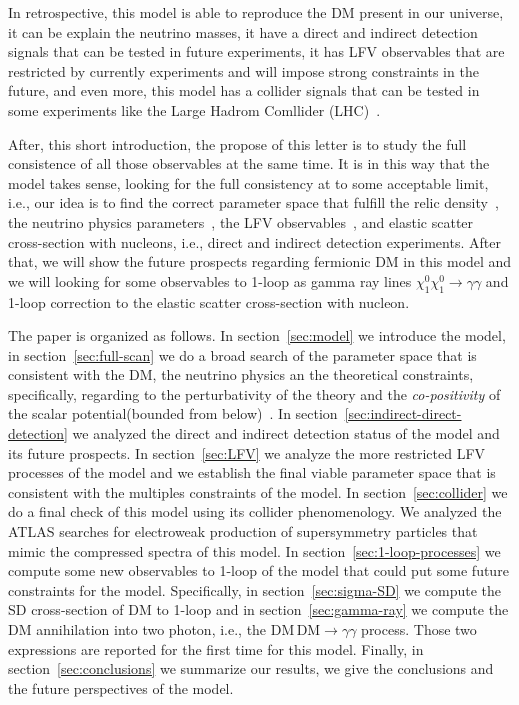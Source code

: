 \documentclass[12pt,letterpaper]{article}
\begin{document}
%
In retrospective, this model is able to reproduce the DM present in our universe, it can be explain the neutrino masses, it have a direct and indirect detection signals that can be tested in future experiments, it has LFV observables that are restricted by currently experiments and will impose strong constraints in the future, and even more, this model has a collider signals that can be tested in some experiments like the Large Hadrom Comllider (LHC)~\cite{Choubey:2017yyn}. 

After, this short introduction, the propose of this letter is to study the full consistence of all those observables at the same time. It is in this way that the model takes sense, looking for the full consistency at to some acceptable limit, i.e., 
our idea is to find the correct parameter space that fulfill the relic density~\cite{Aghanim:2018eyx}, the neutrino physics parameters~\cite{Forero:2014bxa, deSalas:2017kay}, the LFV observables~\cite{Rocha-Moran:2016enp}, and elastic scatter cross-section with nucleons, i.e., direct and indirect detection experiments. 
After that, we will show the future prospects regarding fermionic DM in this model and we will looking for some observables to 1-loop as gamma ray lines $\chi^0_1\chi^0_1\to\gamma\gamma$ and 1-loop correction to the elastic scatter cross-section with nucleon.

The paper is organized as follows. In section~\ref{sec:model} we introduce the model, in section~\ref{sec:full-scan} we do a broad search of the parameter space that is consistent with the DM, the neutrino physics an the theoretical constraints, specifically, regarding to the perturbativity of the theory and the \textit{co-positivity} of the scalar potential(bounded from below)~\cite{Merle:2016scw}. 
In section~\ref{sec:indirect-direct-detection} we analyzed the direct and indirect detection status of the model and its future prospects. 
In section~\ref{sec:LFV} we analyze the more restricted LFV processes of the model and we establish the final viable parameter space that is consistent with the multiples constraints of the model.
In section~\ref{sec:collider} we do a final check of this model using its collider phenomenology. We analyzed the ATLAS searches for electroweak production of supersymmetry particles that mimic the compressed spectra of this model.
%
In section~\ref{sec:1-loop-processes} we compute some new observables to 1-loop of the model that could put some future constraints for the model.
%
Specifically, in section~\ref{sec:sigma-SD} we compute the SD cross-section of DM to 1-loop and in section~\ref{sec:gamma-ray} we compute the DM annihilation into two photon, i.e., the $\text{DM}\,\text{DM} \to \gamma\gamma$ process. Those two expressions are reported for the first time for this model.
Finally, in section~\ref{sec:conclusions} we summarize our results, we give the conclusions and the future perspectives of the model.
\end{document}
